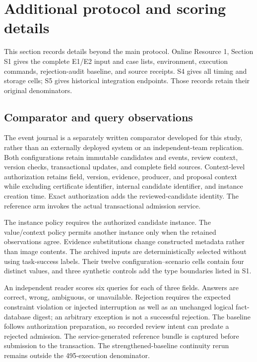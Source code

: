 \section{Additional protocol and scoring details}
\label{app:detailed-protocol}

This section records details beyond the main protocol. Online Resource 1, Section S1 gives the complete E1/E2 input and case lists, environment, execution commands, rejection-audit baseline, and source receipts. S4 gives all timing and storage cells; S5 gives historical integration endpoints. Those records retain their original denominators.

\subsection{Comparator and query observations}

The event journal is a separately written  comparator developed for this study, rather than an externally deployed system or an independent-team replication. Both configurations retain immutable candidates and events, review context, version checks, transactional updates, and complete field sources. Context-level authorization retains field, version, evidence, producer, and proposal context while excluding certificate identifier, internal candidate identifier, and instance creation time. Exact authorization adds the reviewed-candidate identity. The reference arm invokes the actual transactional admission service.

The instance policy requires the authorized candidate instance. The value/context policy permits another instance only when the retained observations agree. Evidence substitutions change constructed metadata rather than image contents. The archived inputs are deterministically selected without using task-success labels. Their twelve configuration--scenario cells contain four distinct values, and three synthetic controls add the type boundaries listed in S1.

An independent reader scores six queries for each of three fields. Answers are correct, wrong, ambiguous, or unavailable. Rejection requires the expected constraint violation or injected interruption as well as an unchanged logical fact-database digest; an arbitrary exception is not a successful rejection. The baseline follows authorization preparation, so recorded review intent can predate a rejected admission. The service-generated reference bundle is captured before submission to the transaction. The strengthened-baseline continuity rerun remains outside the 495-execution denominator.

